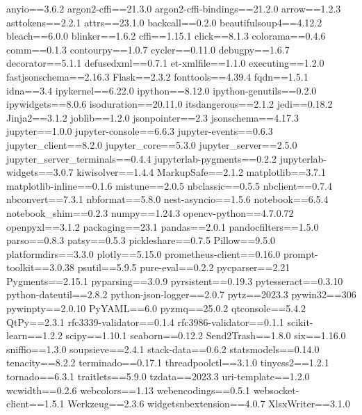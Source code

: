 anyio==3.6.2
argon2-cffi==21.3.0
argon2-cffi-bindings==21.2.0
arrow==1.2.3
asttokens==2.2.1
attrs==23.1.0
backcall==0.2.0
beautifulsoup4==4.12.2
bleach==6.0.0
blinker==1.6.2
cffi==1.15.1
click==8.1.3
colorama==0.4.6
comm==0.1.3
contourpy==1.0.7
cycler==0.11.0
debugpy==1.6.7
decorator==5.1.1
defusedxml==0.7.1
et-xmlfile==1.1.0
executing==1.2.0
fastjsonschema==2.16.3
Flask==2.3.2
fonttools==4.39.4
fqdn==1.5.1
idna==3.4
ipykernel==6.22.0
ipython==8.12.0
ipython-genutils==0.2.0
ipywidgets==8.0.6
isoduration==20.11.0
itsdangerous==2.1.2
jedi==0.18.2
Jinja2==3.1.2
joblib==1.2.0
jsonpointer==2.3
jsonschema==4.17.3
jupyter==1.0.0
jupyter-console==6.6.3
jupyter-events==0.6.3
jupyter_client==8.2.0
jupyter_core==5.3.0
jupyter_server==2.5.0
jupyter_server_terminals==0.4.4
jupyterlab-pygments==0.2.2
jupyterlab-widgets==3.0.7
kiwisolver==1.4.4
MarkupSafe==2.1.2
matplotlib==3.7.1
matplotlib-inline==0.1.6
mistune==2.0.5
nbclassic==0.5.5
nbclient==0.7.4
nbconvert==7.3.1
nbformat==5.8.0
nest-asyncio==1.5.6
notebook==6.5.4
notebook_shim==0.2.3
numpy==1.24.3
opencv-python==4.7.0.72
openpyxl==3.1.2
packaging==23.1
pandas==2.0.1
pandocfilters==1.5.0
parso==0.8.3
patsy==0.5.3
pickleshare==0.7.5
Pillow==9.5.0
platformdirs==3.3.0
plotly==5.15.0
prometheus-client==0.16.0
prompt-toolkit==3.0.38
psutil==5.9.5
pure-eval==0.2.2
pycparser==2.21
Pygments==2.15.1
pyparsing==3.0.9
pyrsistent==0.19.3
pytesseract==0.3.10
python-dateutil==2.8.2
python-json-logger==2.0.7
pytz==2023.3
pywin32==306
pywinpty==2.0.10
PyYAML==6.0
pyzmq==25.0.2
qtconsole==5.4.2
QtPy==2.3.1
rfc3339-validator==0.1.4
rfc3986-validator==0.1.1
scikit-learn==1.2.2
scipy==1.10.1
seaborn==0.12.2
Send2Trash==1.8.0
six==1.16.0
sniffio==1.3.0
soupsieve==2.4.1
stack-data==0.6.2
statsmodels==0.14.0
tenacity==8.2.2
terminado==0.17.1
threadpoolctl==3.1.0
tinycss2==1.2.1
tornado==6.3.1
traitlets==5.9.0
tzdata==2023.3
uri-template==1.2.0
wcwidth==0.2.6
webcolors==1.13
webencodings==0.5.1
websocket-client==1.5.1
Werkzeug==2.3.6
widgetsnbextension==4.0.7
XlsxWriter==3.1.0
